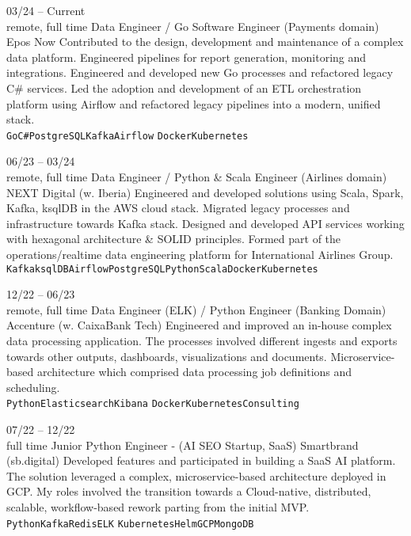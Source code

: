 \documentclass[10pt]{developercv} %
\begin{document}
\begin{entrylist}
	\entry
		{03/24 -- Current\\\footnotesize{remote, full time}}
		{Data Engineer / Go Software Engineer (Payments domain)}
		{Epos Now}
		{
			Contributed to the design, development and maintenance of a complex data platform.
			Engineered pipelines for report generation, monitoring and integrations. Engineered and developed new Go processes and refactored legacy C\# services.
			Led the adoption and development of an ETL orchestration platform using Airflow and refactored legacy pipelines into a modern, unified stack.
			\\
		\texttt{Go}\slashsep\texttt{C\#}\slashsep\texttt{PostgreSQL}\slashsep\texttt{Kafka}\slashsep\texttt{Airflow}
		\slashsep\texttt{Docker}\slashsep\texttt{Kubernetes}}
	
	\entry
		{06/23 -- 03/24\\\footnotesize{remote, full time}}
		{Data Engineer / Python \& Scala Engineer (Airlines domain)}
		{NEXT Digital (w. Iberia)}
		{
			Engineered and developed solutions using Scala, Spark, Kafka, ksqlDB in the AWS cloud stack.
			Migrated legacy processes and infrastructure towards Kafka stack. Designed and developed API services
			working with hexagonal architecture \& SOLID principles. Formed part of the operations/realtime data
			engineering platform for International Airlines Group. 
			\\
		\texttt{Kafka}\slashsep\texttt{ksqlDB}\slashsep\texttt{Airflow}\slashsep\texttt{PostgreSQL}\slashsep\texttt{Python}\slashsep\texttt{Scala}\slashsep\texttt{Docker}\slashsep\texttt{Kubernetes}}
	
	\entry
		{12/22 -- 06/23\\\footnotesize{remote, full time}}
		{Data Engineer (ELK) / Python Engineer (Banking Domain)}
		{Accenture (w. CaixaBank Tech)}
		{
			Engineered and improved an in-house complex data processing application.
			The processes involved different ingests and exports towards other outputs,
			dashboards, visualizations and documents.
			Microservice-based architecture which comprised data processing job
			definitions and scheduling.\\
		\texttt{Python}\slashsep\texttt{Elasticsearch}\slashsep\texttt{Kibana}
		\slashsep\texttt{Docker}\slashsep\texttt{Kubernetes}\slashsep\texttt{Consulting}}
	
	\entry
		{07/22 -- 12/22\\\footnotesize{full time}}
		{Junior Python Engineer - (AI SEO Startup, SaaS)}
		{Smartbrand (sb.digital)}
		{Developed features and participated in building a SaaS AI platform. The solution leveraged a complex, microservice-based architecture deployed in GCP. My roles involved the transition towards a Cloud-native, distributed, scalable, workflow-based rework parting from the initial MVP.\\
		\texttt{Python}\slashsep\texttt{Kafka}\slashsep\texttt{Redis}\slashsep\texttt{ELK}
		\slashsep\texttt{Kubernetes}\slashsep\texttt{Helm}\slashsep\texttt{GCP}\slashsep\texttt{MongoDB}}
	

\end{entrylist}
\end{document}
